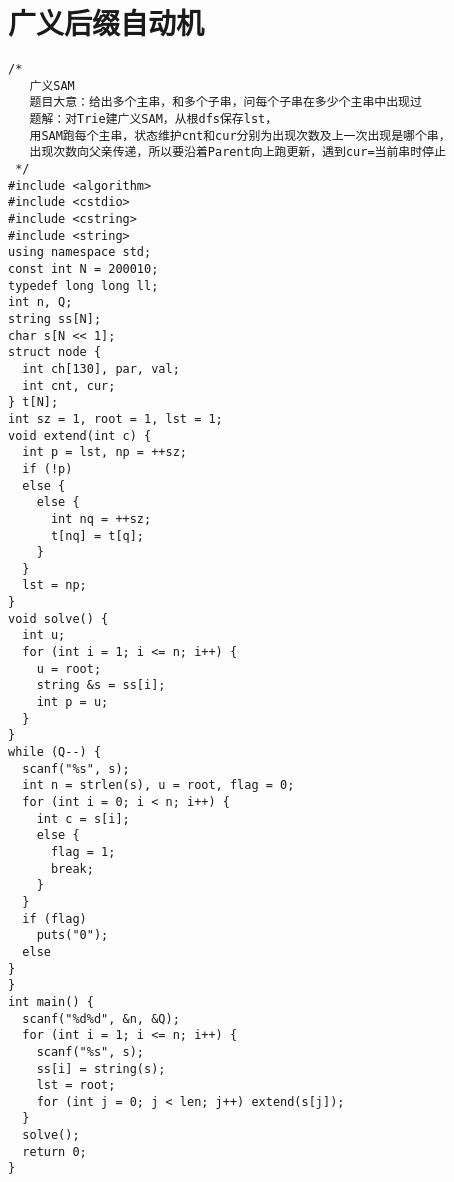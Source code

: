 \section{ 广义后缀自动机}
\begin{lstlisting}
/*
   广义SAM
   题目大意：给出多个主串，和多个子串，问每个子串在多少个主串中出现过
   题解：对Trie建广义SAM，从根dfs保存lst，
   用SAM跑每个主串，状态维护cnt和cur分别为出现次数及上一次出现是哪个串，
   出现次数向父亲传递，所以要沿着Parent向上跑更新，遇到cur=当前串时停止
 */
#include <algorithm>
#include <cstdio>
#include <cstring>
#include <string>
using namespace std;
const int N = 200010;
typedef long long ll;
int n, Q;
string ss[N];
char s[N << 1];
struct node {
  int ch[130], par, val;
  int cnt, cur;
} t[N];
int sz = 1, root = 1, lst = 1;
void extend(int c) {
  int p = lst, np = ++sz;
  if (!p)
  else {
    else {
      int nq = ++sz;
      t[nq] = t[q];
    }
  }
  lst = np;
}
void solve() {
  int u;
  for (int i = 1; i <= n; i++) {
    u = root;
    string &s = ss[i];
    int p = u;
  }
}
while (Q--) {
  scanf("%s", s);
  int n = strlen(s), u = root, flag = 0;
  for (int i = 0; i < n; i++) {
    int c = s[i];
    else {
      flag = 1;
      break;
    }
  }
  if (flag)
    puts("0");
  else
}
}
int main() {
  scanf("%d%d", &n, &Q);
  for (int i = 1; i <= n; i++) {
    scanf("%s", s);
    ss[i] = string(s);
    lst = root;
    for (int j = 0; j < len; j++) extend(s[j]);
  }
  solve();
  return 0;
}
\end{lstlisting}
